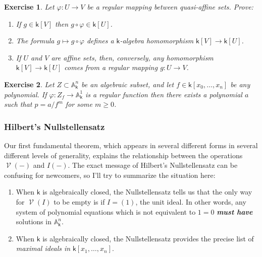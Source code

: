 \documentclass[11pt]{article}
\newcommand{\A}{\mathbb{A}}
\renewcommand{\k}{\mathsf{k}}
\renewcommand{\to}{\longrightarrow}
\DeclareMathOperator{\V}{\mathcal{V}}
\newcommand{\A}{\mathbb A}
\renewcommand{\k}{\mathsf{k}}
\renewcommand{\to}{{\longrightarrow}}
\newtheorem{exercise}{Exercise}[section]
\begin{document}
\begin{exercise}
Let \(\varphi: U \to V\) be a regular mapping between quasi-affine sets.  Prove:
\begin{enumerate}
\item If \(g \in \k[V]\)  then \(g \circ \varphi \in \k[U]\).
\item The formula \(g \mapsto g \circ \varphi\) defines a \(\k\)-algebra homomorphism \(\k[V] \to \k[U]\).
\item If \(U\) and \(V\) are affine sets, then, conversely, any homomorphism \(\k[V] \to \k[U]\) comes from a regular mapping \(g: U \to V\).
\end{enumerate}
\end{exercise}



\begin{exercise}
Let \(Z \subset \A^n_{\k}\) be an algebraic subset, and let \(f \in \k[x_0, \dots, x_n]\) be any polynomial.  If \(\varphi: Z_f \to \A^1_{\k}\) is a regular function then there exists a polynomial \(a\) such that \(p = a/f^{m}\) for some \(m \geq 0\). 
\end{exercise}

\subsubsection{Hilbert's Nullstellensatz}
\label{sec:org0ebb6f2}

Our first fundamental  theorem, which appears in several different forms in several different levels of generality, explains the relationship between the operations \(\V(-)\) and \(I(-)\).  The exact message of Hilbert's Nullstellensatz can be confusing for newcomers, so I'll try to summarize the situation here:

\begin{enumerate}
\item When \(\k\) is algebraically closed, the Nullstellensatz tells us that the only way for \(\V(I)\) to be empty is if \(I = (1)\), the unit ideal. In other words, any system of polynomial equations which is not equivalent to \(1=0\) \textbf{\emph{must have}} solutions in \(\A^n_{\k}\).
\item When \(\k\) is algebraically closed, the Nullstellensatz provides the precise list of \emph{maximal ideals in} \(\k[x_1, \dots, x_n]\).
\end{enumerate}
\end{document}
